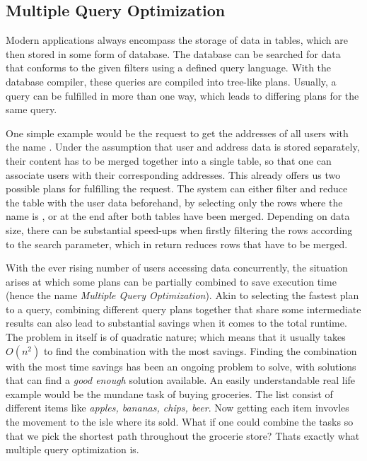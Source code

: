\subsection{Multiple Query Optimization}
Modern applications always encompass the storage of data in tables, which are then stored in some form of database. The database can be searched for data that conforms to the given filters using a defined query language. With the database compiler, these queries are compiled into tree-like plans. Usually, a query can be fulfilled in more than one way, which leads to differing plans for the same query.\par
One simple example would be the request to get the addresses of all users with the name . Under the assumption that user and address data is stored separately, their content has to be merged together into a single table, so that one can associate users with their corresponding addresses. This already offers us two possible plans for fulfilling the request. The system can either filter and reduce the table with the user data beforehand, by selecting only the rows where the name is , or at the end after both tables have been merged. Depending on data size, there can be substantial speed-ups when firstly filtering the rows according to the search parameter, which in return reduces rows that have to be merged.\par 
With the ever rising number of users accessing data concurrently, the situation arises at which some plans can be partially combined to save execution time (hence the name \emph{Multiple Query Optimization}). Akin to selecting the fastest plan to a query, combining different query plans together that share some intermediate results can also lead to substantial savings when it comes to the total runtime. The problem in itself is of quadratic nature; which means that it usually takes $O(n^2)$ to find the combination with the most savings. Finding the combination with the most time savings has been an ongoing problem to solve, with solutions that can find a \emph{good enough} solution available. An easily understandable real life example would be the mundane task of buying groceries. The list consist of different items like \emph{apples, bananas, chips, beer}. Now getting each item invovles the movement to the isle where its sold. What if one could combine the tasks so that we pick the shortest path throughout the grocerie store? Thats exactly what multiple query optimization is.

